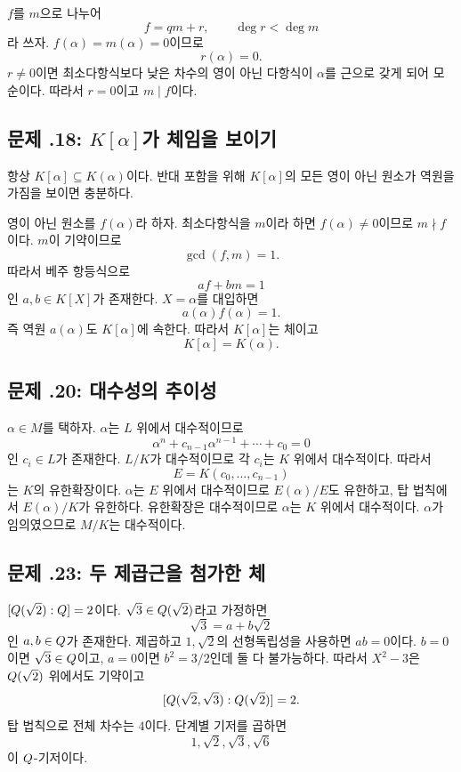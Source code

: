 \begin{solution}
$f$를 $m$으로 나누어
\[
  f=qm+r,
  \qquad \deg r<\deg m
\]
라 쓰자. $f(\alpha)=m(\alpha)=0$이므로
\[
  r(\alpha)=0.
\]
$r\ne0$이면 최소다항식보다 낮은 차수의 영이 아닌 다항식이 $\alpha$를 근으로 갖게 되어 모순이다. 따라서 $r=0$이고 $m\mid f$이다.
\end{solution}

\subsection*{문제 \thechapter.18: $K[\alpha]$가 체임을 보이기}

\begin{solution}
항상 $K[\alpha]\subseteq K(\alpha)$이다. 반대 포함을 위해 $K[\alpha]$의 모든 영이 아닌 원소가 역원을 가짐을 보이면 충분하다.

영이 아닌 원소를 $f(\alpha)$라 하자. 최소다항식을 $m$이라 하면 $f(\alpha)\ne0$이므로 $m\nmid f$이다. $m$이 기약이므로
\[
  \gcd(f,m)=1.
\]
따라서 베주 항등식으로
\[
  a f+b m=1
\]
인 $a,b\in K[X]$가 존재한다. $X=\alpha$를 대입하면
\[
  a(\alpha)f(\alpha)=1.
\]
즉 역원 $a(\alpha)$도 $K[\alpha]$에 속한다. 따라서 $K[\alpha]$는 체이고
\[
  K[\alpha]=K(\alpha).
\]
\end{solution}

\subsection*{문제 \thechapter.20: 대수성의 추이성}

\begin{solution}
$\alpha\in M$를 택하자. $\alpha$는 $L$ 위에서 대수적이므로
\[
  \alpha^n+c_{n-1}\alpha^{n-1}+\cdots+c_0=0
\]
인 $c_i\in L$가 존재한다. $L/K$가 대수적이므로 각 $c_i$는 $K$ 위에서 대수적이다. 따라서
\[
  E=K(c_0,\dots,c_{n-1})
\]
는 $K$의 유한확장이다. $\alpha$는 $E$ 위에서 대수적이므로 $E(\alpha)/E$도 유한하고, 탑 법칙에서 $E(\alpha)/K$가 유한하다. 유한확장은 대수적이므로 $\alpha$는 $K$ 위에서 대수적이다. $\alpha$가 임의였으므로 $M/K$는 대수적이다.
\end{solution}

\subsection*{문제 \thechapter.23: 두 제곱근을 첨가한 체}

\begin{solution}
$[Q(\sqrt2):Q]=2$이다. $\sqrt3\in Q(\sqrt2)$라고 가정하면
\[
  \sqrt3=a+b\sqrt2
\]
인 $a,b\in Q$가 존재한다. 제곱하고 $1,\sqrt2$의 선형독립성을 사용하면 $ab=0$이다. $b=0$이면 $\sqrt3\in Q$이고, $a=0$이면 $b^2=3/2$인데 둘 다 불가능하다. 따라서 $X^2-3$은 $Q(\sqrt2)$ 위에서도 기약이고
\[
  [Q(\sqrt2,\sqrt3):Q(\sqrt2)]=2.
\]
탑 법칙으로 전체 차수는 $4$이다. 단계별 기저를 곱하면
\[
  1,\sqrt2,\sqrt3,\sqrt6
\]
이 $Q$-기저이다.
\end{solution}

